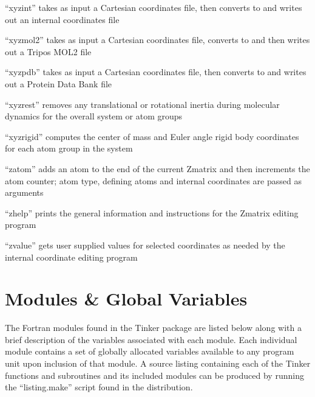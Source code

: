 \documentclass[letterpaper,11pt,english]{sphinxmanual}
\begin{document}
\sphinxAtStartPar
“xyzint” takes as input a Cartesian coordinates file, then converts to and writes out an internal coordinates file

\sphinxAtStartPar
{}

\sphinxAtStartPar
“xyzmol2” takes as input a Cartesian coordinates file, converts to and then writes out a Tripos MOL2 file

\sphinxAtStartPar
{}

\sphinxAtStartPar
“xyzpdb” takes as input a Cartesian coordinates file, then converts to and writes out a Protein Data Bank file

\sphinxAtStartPar
{}

\sphinxAtStartPar
“xyzrest” removes any translational or rotational inertia during molecular dynamics for the overall system or atom groups

\sphinxAtStartPar
{}

\sphinxAtStartPar
“xyzrigid” computes the center of mass and Euler angle rigid body coordinates for each atom group in the system

\sphinxAtStartPar
{}

\sphinxAtStartPar
“zatom” adds an atom to the end of the current Z\sphinxhyphen{}matrix and then increments the atom counter; atom type, defining atoms and internal coordinates are passed as arguments

\sphinxAtStartPar
{}

\sphinxAtStartPar
“zhelp” prints the general information and instructions for the Z\sphinxhyphen{}matrix editing program

\sphinxAtStartPar
{}

\sphinxAtStartPar
“zvalue” gets user supplied values for selected coordinates as needed by the internal coordinate editing program

\sphinxstepscope


\chapter{Modules \& Global Variables}
\label{\detokenize{text/modules:modules-global-variables}}\label{\detokenize{text/modules::doc}}
\sphinxAtStartPar
The Fortran modules found in the Tinker package are listed below along with a brief description of the variables associated with each module. Each individual module contains a set of globally allocated variables available to any program unit upon inclusion of that module. A source listing containing each of the Tinker functions and subroutines and its included modules can be produced by running the “listing.make” script found in the distribution.
\end{document}
